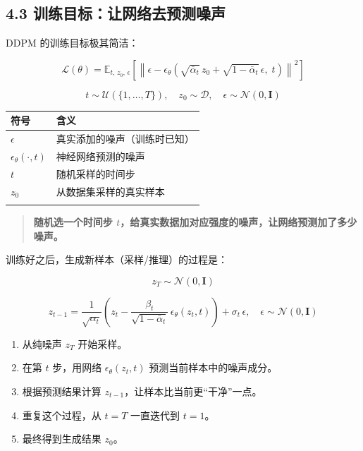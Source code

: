 \documentclass[
  chinese,
]{ctexart}
\providecommand{\tightlist}{%
  \setlength{\itemsep}{0pt}\setlength{\parskip}{0pt}}
\begin{document}
\subsection{4.3
训练目标：让网络去预测噪声}\label{ux8badux7ec3ux76eeux6807ux8ba9ux7f51ux7edcux53bbux9884ux6d4bux566aux58f0}

DDPM 的训练目标极其简洁：

\[
\mathcal{L}(\theta) = \mathbb{E}_{t,\, z_0,\, \epsilon}\left[\left\| \epsilon - \epsilon_\theta\!\left(\sqrt{\bar{\alpha}_t}\, z_0 + \sqrt{1 - \bar{\alpha}_t}\, \epsilon,\; t\right)\right\|^2\right]
\]

\[
t \sim \mathcal{U}(\{1, \ldots, T\}), \quad z_0 \sim \mathcal{D}, \quad \epsilon \sim \mathcal{N}(0, \mathbf{I})
\]

\begin{center}
\begin{tabular}{@{}>{\raggedright\arraybackslash}p{} >{\raggedright\arraybackslash}p{}@{}}
\toprule\noalign{}
符号 & 含义 \\
\midrule\noalign{}
\(\epsilon\) & 真实添加的噪声（训练时已知） \\
\(\epsilon_\theta(\cdot, t)\) & 神经网络预测的噪声 \\
\(t\) & 随机采样的时间步 \\
\(z_0\) & 从数据集采样的真实样本 \\
\bottomrule\noalign{}
\end{tabular}
\end{center}

\begin{quote}
\textbf{随机选一个时间步
\(t\)，给真实数据加对应强度的噪声，让网络预测加了多少噪声。}
\end{quote}

训练好之后，生成新样本（采样/推理）的过程是：

\[
z_T \sim \mathcal{N}(0, \mathbf{I})
\]

\[
z_{t-1} = \frac{1}{\sqrt{\alpha_t}}\left(z_t - \frac{\beta_t}{\sqrt{1 - \bar{\alpha}_t}}\, \epsilon_\theta(z_t, t)\right) + \sigma_t\, \epsilon, \quad \epsilon \sim \mathcal{N}(0, \mathbf{I})
\]

\begin{enumerate}
\def\labelenumi{\arabic{enumi}.}
\tightlist
\item
  从纯噪声 \(z_T\) 开始采样。
\item
  在第 \(t\) 步，用网络 \(\epsilon_\theta(z_t, t)\)
  预测当前样本中的噪声成分。
\item
  根据预测结果计算 \(z_{t-1}\)，让样本比当前更``干净''一点。
\item
  重复这个过程，从 \(t = T\) 一直迭代到 \(t = 1\)。
\item
  最终得到生成结果 \(z_0\)。
\end{enumerate}
\end{document}
